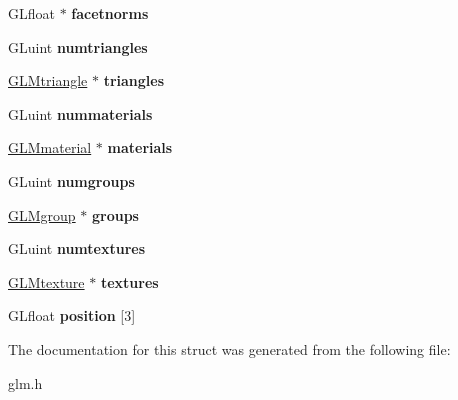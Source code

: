 \begin{DoxyCompactItemize}
\item 
\hypertarget{struct__GLMmodel_ad3b2510d3e3c46ac90bb1c84c16626a9}{\-G\-Lfloat $\ast$ {\bfseries facetnorms}}\label{struct__GLMmodel_ad3b2510d3e3c46ac90bb1c84c16626a9}

\item 
\hypertarget{struct__GLMmodel_a16072026f654ae83cb2de85c39416eef}{\-G\-Luint {\bfseries numtriangles}}\label{struct__GLMmodel_a16072026f654ae83cb2de85c39416eef}

\item 
\hypertarget{struct__GLMmodel_adf36c3b98e1f72f828bb5a2a1675272e}{\hyperlink{struct__GLMtriangle}{\-G\-L\-Mtriangle} $\ast$ {\bfseries triangles}}\label{struct__GLMmodel_adf36c3b98e1f72f828bb5a2a1675272e}

\item 
\hypertarget{struct__GLMmodel_a5d84bb75098edd15507bc1f29a5540a9}{\-G\-Luint {\bfseries nummaterials}}\label{struct__GLMmodel_a5d84bb75098edd15507bc1f29a5540a9}

\item 
\hypertarget{struct__GLMmodel_a0bcb1bd406622c8ff09770796fe90278}{\hyperlink{struct__GLMmaterial}{\-G\-L\-Mmaterial} $\ast$ {\bfseries materials}}\label{struct__GLMmodel_a0bcb1bd406622c8ff09770796fe90278}

\item 
\hypertarget{struct__GLMmodel_a54e1b2ca7e03175c3189a2f5db7f53de}{\-G\-Luint {\bfseries numgroups}}\label{struct__GLMmodel_a54e1b2ca7e03175c3189a2f5db7f53de}

\item 
\hypertarget{struct__GLMmodel_ad7401a2f601a5720fc560bd49111436c}{\hyperlink{struct__GLMgroup}{\-G\-L\-Mgroup} $\ast$ {\bfseries groups}}\label{struct__GLMmodel_ad7401a2f601a5720fc560bd49111436c}

\item 
\hypertarget{struct__GLMmodel_a417e99c00af3e58eaa3a95c8ab151bc6}{\-G\-Luint {\bfseries numtextures}}\label{struct__GLMmodel_a417e99c00af3e58eaa3a95c8ab151bc6}

\item 
\hypertarget{struct__GLMmodel_ae9534715273102e399c876effe6a84ae}{\hyperlink{struct__GLMtexture}{\-G\-L\-Mtexture} $\ast$ {\bfseries textures}}\label{struct__GLMmodel_ae9534715273102e399c876effe6a84ae}

\item 
\hypertarget{struct__GLMmodel_acab837a5075b2f0301b4c6c8c4a465b4}{\-G\-Lfloat {\bfseries position} \mbox{[}3\mbox{]}}\label{struct__GLMmodel_acab837a5075b2f0301b4c6c8c4a465b4}

\end{DoxyCompactItemize}


\-The documentation for this struct was generated from the following file\-:\begin{DoxyCompactItemize}
\item 
glm.\-h\end{DoxyCompactItemize}
